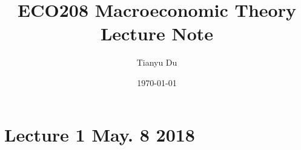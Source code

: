 \documentclass[11pt]{article}
\title{ECO208 Macroeconomic Theory \\ Lecture Note}
\author{Tianyu Du}
\date{\today}
\begin{document}
\maketitle
\tableofcontents

\section{Lecture 1 May. 8 2018}
\end{document}
